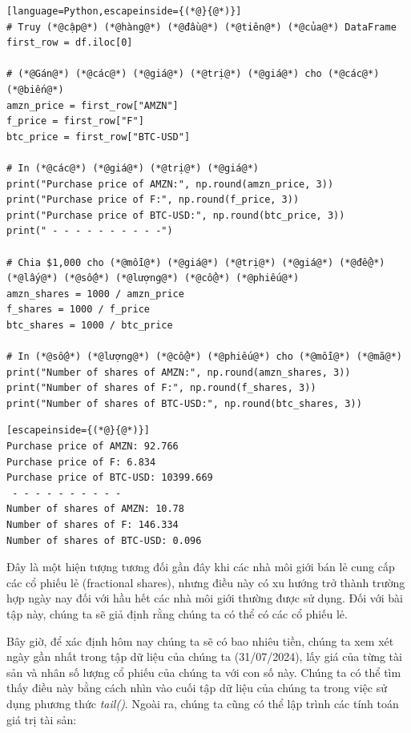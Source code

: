 \begin{lstlisting}[language=Python,escapeinside={(*@}{@*)}]
# Truy (*@cập@*) (*@hàng@*) (*@đầu@*) (*@tiên@*) (*@của@*) DataFrame
first_row = df.iloc[0]

# (*@Gán@*) (*@các@*) (*@giá@*) (*@trị@*) (*@giá@*) cho (*@các@*) (*@biến@*)
amzn_price = first_row["AMZN"]
f_price = first_row["F"]
btc_price = first_row["BTC-USD"]

# In (*@các@*) (*@giá@*) (*@trị@*) (*@giá@*)
print("Purchase price of AMZN:", np.round(amzn_price, 3))
print("Purchase price of F:", np.round(f_price, 3))
print("Purchase price of BTC-USD:", np.round(btc_price, 3))
print(" - - - - - - - - - -")

# Chia $1,000 cho (*@mỗi@*) (*@giá@*) (*@trị@*) (*@giá@*) (*@để@*) (*@lấy@*) (*@số@*) (*@lượng@*) (*@cổ@*) (*@phiếu@*)
amzn_shares = 1000 / amzn_price
f_shares = 1000 / f_price
btc_shares = 1000 / btc_price

# In (*@số@*) (*@lượng@*) (*@cổ@*) (*@phiếu@*) cho (*@mỗi@*) (*@mã@*)
print("Number of shares of AMZN:", np.round(amzn_shares, 3))
print("Number of shares of F:", np.round(f_shares, 3))
print("Number of shares of BTC-USD:", np.round(btc_shares, 3))
\end{lstlisting}

\begin{lstlisting}[escapeinside={(*@}{@*)}]
Purchase price of AMZN: 92.766
Purchase price of F: 6.834
Purchase price of BTC-USD: 10399.669
 - - - - - - - - - -
Number of shares of AMZN: 10.78
Number of shares of F: 146.334
Number of shares of BTC-USD: 0.096
\end{lstlisting}

Đây là một hiện tượng tương đối gần đây khi các nhà môi giới bán lẻ cung cấp các cổ phiếu lẻ (fractional shares), nhưng điều này có xu hướng trở thành trường hợp ngày nay đối với hầu hết các nhà môi giới thường được sử dụng. Đối với bài tập này, chúng ta sẽ giả định rằng chúng ta có thể có các cổ phiếu lẻ.

Bây giờ, để xác định hôm nay chúng ta sẽ có bao nhiêu tiền, chúng ta xem xét ngày gần nhất trong tập dữ liệu của chúng ta (31/07/2024), lấy giá của từng tài sản và nhân số lượng cổ phiếu của chúng ta với con số này. Chúng ta có thể tìm thấy điều này bằng cách nhìn vào cuối tập dữ liệu của chúng ta trong việc sử dụng phương thức \emph{tail()}. Ngoài ra, chúng ta cũng có thể lập trình các tính toán giá trị tài sản:

